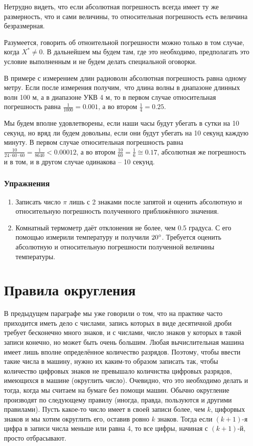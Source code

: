 Нетрудно видеть, что если абсолютная погрешность всегда имеет ту же размерность,
что и сами величины, то относительная погрешность есть величина безразмерная.

Разумеется, говорить об отноительной погрешности можно только в том случае,
когда $X^* \neq 0$. В дальнейшем мы будем там, где это необходимо, предполагать
это условие выполненным и не будем делать специальной оговорки.

В примере с измерением длин радиоволн абсолютная погрешность равна одному метру.
Если после измерения получим, что длина волны в диапазоне длинных волн 100 м, а
в диапазоне УКВ 4 м, то в первом случае относительная погрешность равна
$\frac{1}{1000} = 0.001$, а во втором $\frac{1}{4} = 0.25$.

Мы будем вполне удовлетворены, если наши часы будут убегать в сутки на 10
секунд, но вряд ли будем довольны, если они будут убегать на 10 секунд каждую
минуту. В первом случае относительная погрешность равна $\frac{10}{24 \cdot 60
\cdot 60} = \frac{1}{8640} < 0.00012$, а во втором $\frac{10}{60} = \frac{1}{6}
\cong 0.17$, абсолютная же погрешность и в том, и в другом случае одинакова --
10 секунд.

\subsubsection{Упражнения}
\begin{enumerate}
	\item Записать число $\pi$ лишь с 2 знаками после запятой и оценить
		абсолютную и относительную погрешность полученного приближённого
		значения.
	\item Комнатный термометр даёт отклонения не более, чем 0.5 градуса. С
		его помощью измерили температуру и получили $20\degree$.
		Требуется оценить абсолютную и относительную погрешности
		полученной величины температуры.
\end{enumerate}

\section{Правила округления}
В предыдущем параграфе мы уже говорили о том, что на практике часто приходится
иметь дело с числами, запись которых в виде десятичной дроби требует бесконечно
много знаков, и с числами, число знаков у которых в такой записи конечно, но
может быть очень большим. Любая вычислительная машина имеет лишь вполне
определённое количество разрядов. Поэтому, чтобы ввести такие числа в машину,
нужно их каким-то образом записать так, чтобы количество цифровых знаков не
превышало количнства цифровых разрядов, имеющихся в машине (округлить число).
Очевидно, что это необходимо делать и тогда, когда мы считаем на бумаге без
помощи машин. Обычно округление производят по следующему правилу (иногда,
правда, пользуются и другими правилами). Пусть какое-то число имеет в своей
записи более, чем $k$, цифорвых знаков и мы хотим округлить его, оставив ровно
$k$ знаков. Тогда если $(k + 1)$-я цифра в записи числа меньше или равна 4, то
все цифры, начиная с $(k + 1)$-й, просто отбрасывают.

